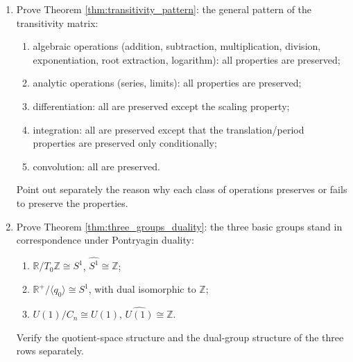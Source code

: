 \begin{enumerate}[leftmargin=3em, label=\textbf{Exercise \arabic*}]
    \item Prove Theorem \ref{thm:transitivity_pattern}:
    the general pattern of the transitivity matrix:
    \begin{enumerate}[label=(\roman*)]
        \item algebraic operations (addition, subtraction, multiplication, division, exponentiation, root extraction, logarithm): all properties are preserved;
        \item analytic operations (series, limits): all properties are preserved;
        \item differentiation: all are preserved except the scaling property;
        \item integration: all are preserved except that the translation/period properties are preserved only conditionally;
        \item convolution: all are preserved.
    \end{enumerate}
    Point out separately the reason why each class of operations preserves or fails to preserve the properties.

    \item Prove Theorem \ref{thm:three_groups_duality}:
    the three basic groups stand in correspondence under Pontryagin duality:
    \begin{enumerate}[label=(\roman*)]
        \item $\mathbb{R}/T_0\mathbb{Z}\cong S^1$, $\widehat{S^1}\cong\mathbb{Z}$;
        \item $\mathbb{R}^+/\langle q_0\rangle\cong S^1$, with dual isomorphic to $\mathbb{Z}$;
        \item $U(1)/C_n\cong U(1)$, $\widehat{U(1)}\cong\mathbb{Z}$.
    \end{enumerate}
    Verify the quotient-space structure and the dual-group structure of the three rows separately.


\end{enumerate}
